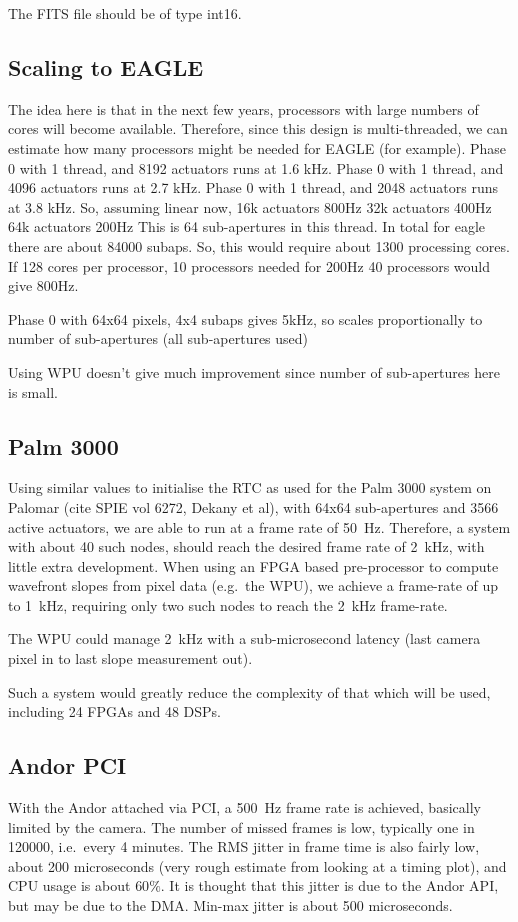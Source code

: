 \documentclass[a4,10pt]{article}
\begin{document}
The FITS file should be of type int16.

\subsection{Scaling to EAGLE}
The idea here is that in the next few years, processors with large
numbers of cores will become available.  Therefore, since this design
is multi-threaded, we can estimate how many processors might be needed
for EAGLE (for example).
Phase 0 with 1 thread, and 8192 actuators runs at 1.6 kHz.
Phase 0 with 1 thread, and 4096 actuators runs at 2.7 kHz.
Phase 0 with 1 thread, and 2048 actuators runs at 3.8 kHz.
So, assuming linear now, 16k actuators 800Hz
32k actuators 400Hz
64k actuators 200Hz
This is 64 sub-apertures in this thread.
In total for eagle there are about 84000 subaps.
So, this would require about 1300 processing cores.
If 128 cores per processor, 10 processors needed for 200Hz
40 processors would give 800Hz.

Phase 0 with 64x64 pixels, 4x4 subaps gives 5kHz, so scales
proportionally to number of sub-apertures (all sub-apertures used)

Using WPU doesn't give much improvement since number of sub-apertures
here is small.  

\subsection{Palm 3000}
Using similar values to initialise the RTC as used for the Palm 3000
system on Palomar (cite SPIE vol 6272, Dekany et al), with 64x64
sub-apertures and 3566 active actuators, we are able to run at a frame
rate of 50~Hz.  Therefore, a system with about 40 such nodes, should
reach the desired frame rate of 2~kHz, with little extra development.
When using an FPGA based pre-processor to compute wavefront slopes
from pixel data (e.g.\ the WPU), we achieve a frame-rate of up to
1~kHz, requiring only two such nodes to reach the 2~kHz frame-rate.

The WPU could manage 2~kHz with a sub-microsecond latency (last camera
pixel in to last slope measurement out).

Such a system would greatly reduce the complexity of that which will
be used, including 24 FPGAs and 48 DSPs.

\subsection{Andor PCI}
With the Andor attached via PCI, a 500~Hz frame rate is achieved,
basically limited by the camera.  The number of missed frames is low,
typically one in 120000, i.e.\ every 4 minutes.  The RMS jitter in
frame time is also fairly low, about 200 microseconds (very rough
estimate from looking at a timing plot), and CPU usage is about
$60\%$.  It is thought that this jitter is due to the Andor API, but
may be due to the DMA.  Min-max jitter is about 500 microseconds.  
\end{document}
